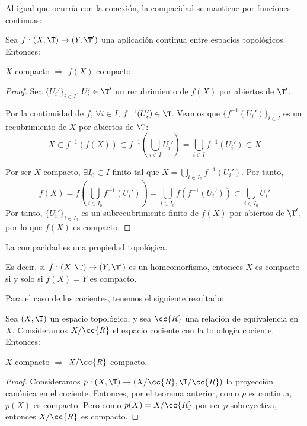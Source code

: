 Al igual que ocurría con la conexión, la compacidad se mantiene por funciones continuas:
\begin{prop}
    Sea $f:(X,\T)\to (Y,\T')$ una aplicación continua entre espacios topológicos. Entonces:
    \begin{center}
        $X$ compacto $\Longrightarrow$ $f(X)$ compacto.
    \end{center}
\end{prop}
\begin{proof}
    Sea $\{U_i'\}_{i\in I}$, $U_i'\in \T'$ un recubrimiento de $f(X)$ por abiertos de $\T'$.

    Por la continuidad de $f$, $\forall i\in I$, $f^{-1}(U_i')\in \T$. Veamos que $\{f^{-1}(U_i')\}_{i\in I}$ es un recubrimiento de $X$ por abiertos de $\T$:
    \begin{equation*}
        X \subset f^{-1}(f(X)) \subset f^{-1}\left(\bigcup_{i\in I}U_i'\right) = \bigcup_{i\in I}f^{-1}(U_i') \subset X
    \end{equation*}

    Por ser $X$ compacto, $\exists I_0\subset I$ finito tal que $X=\bigcup\limits_{i\in I_0}f^{-1}(U_i')$. Por tanto,
    \begin{equation*}
        f(X) = f\left(\bigcup_{i\in I_0}f^{-1}(U_i')\right) = \bigcup_{i\in I_0}f(f^{-1}(U_i')) \subset \bigcup_{i\in I_0}U_i'
    \end{equation*}
    Por tanto, $\{U_i'\}_{i\in I_0}$ es un subrecubrimiento finito de $f(X)$ por abiertos de $\T'$, por lo que $f(X)$ es compacto.
\end{proof}
\begin{coro}
    La compacidad es una propiedad topológica.

    Es decir, si $f:(X,\T)\to (Y,\T')$ es un homeomorfismo, entonces $X$ es compacto si y solo si $f(X)=Y$ es compacto.
\end{coro}

Para el caso de los cocientes, tenemos el siguiente resultado:
\begin{prop}
    Sea $(X,\T)$ un espacio topológico, y sea $\cc{R}$ una relación de equivalencia en $X$. Consideramos $X/\cc{R}$ el espacio cociente con la topología cociente.
    Entonces:
    \begin{center}
        $X$ compacto $\Longrightarrow$ $X/\cc{R}$ compacto.
    \end{center}
\end{prop}
\begin{proof}
    Consideramos $p:(X,\T)\to (X/\cc{R}, \T/\cc{R})$ la proyección canónica en el cociente.
    Entonces, por el teorema anterior, como $p$ es continua, $p(X)$ es compacto. Pero como $p(X)=X/\cc{R}$ por ser $p$ sobreyectiva, entonces $X/\cc{R}$ es compacto.
\end{proof}

